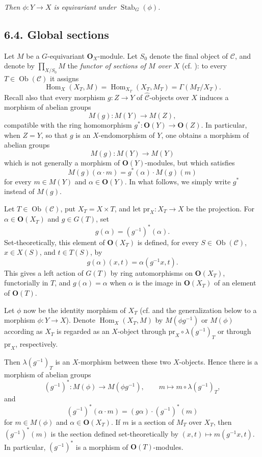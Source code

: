\textit{Then \(\phi:Y\to X\) is equivariant under
\(\operatorname{Stab}_G(\phi)\).}

\subsection*{6.4. Global sections}

Let \(M\) be a \(G\)-equivariant \(\mathbf O_X\)-module. Let \(S_0\)
denote the final object of \(\mathscr C\), and denote by
\(\prod_{X/S_0}M\) the \emph{functor of sections of \(M\) over \(X\)}
(cf. ): to every \(T\in\operatorname{Ob}(\mathscr C)\)
it assigns
\[
  \operatorname{Hom}_X(X_T,M)
  =\operatorname{Hom}_{X_T}(X_T,M_T)
  =\Gamma(M_T/X_T).
\]
Recall also that every morphism \(g:Z\to Y\) of
\(\widehat{\mathscr C}\)-objects over \(X\) induces a morphism of
abelian groups
\[
  M(g):M(Y)\longrightarrow M(Z),
\]
compatible with the ring homomorphism \(g^*:\mathbf O(Y)\to\mathbf
O(Z)\). In particular, when \(Z=Y\), so that \(g\) is an
\(X\)-endomorphism of \(Y\), one obtains a morphism of abelian groups
\[
  M(g):M(Y)\longrightarrow M(Y)
\]
which is not generally a morphism of \(\mathbf O(Y)\)-modules, but
which satisfies
\[
  M(g)(\alpha\cdot m)=g^*(\alpha)\cdot M(g)(m)
\]
for every \(m\in M(Y)\) and \(\alpha\in\mathbf O(Y)\). In what follows,
we simply write \(g^*\) instead of \(M(g)\).

Let \(T\in\operatorname{Ob}(\mathscr C)\), put \(X_T=X\times T\), and
let \(\mathrm{pr}_X:X_T\to X\) be the projection. For
\(\alpha\in\mathbf O(X_T)\) and \(g\in G(T)\), set
\[
  g(\alpha)=(g^{-1})^*(\alpha).
\]
Set-theoretically, this element of \(\mathbf O(X_T)\) is defined, for
every \(S\in\operatorname{Ob}(\mathscr C)\), \(x\in X(S)\), and
\(t\in T(S)\), by
\[
  g(\alpha)(x,t)=\alpha(g^{-1}x,t).
\]
This gives a left action of \(G(T)\) by ring automorphisms on
\(\mathbf O(X_T)\), functorially in \(T\), and \(g(\alpha)=\alpha\)
when \(\alpha\) is the image in \(\mathbf O(X_T)\) of an element of
\(\mathbf O(T)\).

Let \(\phi\) now be the identity morphism of \(X_T\) (cf.  and the
generalization below to a morphism \(\phi:Y\to X\)). Denote
\(\operatorname{Hom}_X(X_T,M)\) by \(M(\phi g^{-1})\) or \(M(\phi)\)
according as \(X_T\) is regarded as an \(X\)-object through
\(\mathrm{pr}_X\circ\lambda(g^{-1})_T\) or through
\(\mathrm{pr}_X\), respectively.

Then \(\lambda(g^{-1})_T\) is an \(X\)-morphism between these two
\(X\)-objects. Hence there is a morphism of abelian groups
\[
  (g^{-1})^*:M(\phi)\longrightarrow M(\phi g^{-1}),
  \qquad
  m\longmapsto m\circ\lambda(g^{-1})_T,
\]
and
\[
  (g^{-1})^*(\alpha\cdot m)
  =(g\alpha)\cdot(g^{-1})^*(m)
\]
for \(m\in M(\phi)\) and \(\alpha\in\mathbf O(X_T)\). If \(m\) is a
section of \(M_T\) over \(X_T\), then \((g^{-1})^*(m)\) is the section
defined set-theoretically by
\((x,t)\mapsto m(g^{-1}x,t)\). In particular, \((g^{-1})^*\) is a
morphism of \(\mathbf O(T)\)-modules.

